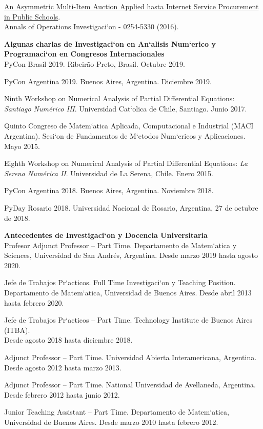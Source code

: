 \href{https://www.dropbox.com/s/1ai0z0pcyhskpzp/JM-2016.pdf?dl=0}
{\color{blue}An Asymmetric Multi-Item Auction Applied
hasta Internet Service Procurement in Public Schools}.\\
Annals of Operations Investigaci`on - 0254-5330 (2016).

\textbf{Algunas charlas de Investigaci`on en An`alisis Num`erico y Programaci`on
en Congresos Internacionales}\\[6pt]
PyCon Brasil 2019. Ribeir\~ao Preto, Brasil. Octubre 2019.

PyCon Argentina 2019. Buenos Aires, Argentina. Diciembre 2019.

Ninth Workshop on Numerical Analysis of Partial Differential Equations: 
\emph{Santiago Num\'erico III}. Universidad Cat`olica de Chile, Santiago. Junio 2017.

Quinto Congreso de Matem`atica Aplicada, Computacional e Industrial (MACI Argentina).
Sesi`on de Fundamentos de M`etodos Num`ericos y Aplicaciones. Mayo 2015.

Eighth Workshop on Numerical Analysis of Partial Differential Equations:
\emph{La Serena Num\'erica II}. Universidad de La Serena, Chile. Enero 2015.

PyCon Argentina 2018. Buenos Aires, Argentina. Noviembre 2018.

PyDay Rosario 2018. Universidad Nacional de Rosario, Argentina, 27 de octubre
de 2018.

\textbf{Antecedentes de Investigaci`on y Docencia Universitaria}\\[6pt]
Profesor Adjunct Professor -- Part Time. Departamento  de Matem`atica y Sciences,
Universidad de San Andr\'es, Argentina. Desde marzo 2019 hasta agosto 2020.

Jefe de Trabajos Pr`acticos. Full Time Investigaci`on y Teaching Position. 
Departamento  de Matem`atica, Universidad de Buenos Aires. Desde abril 2013 hasta
febrero 2020.

Jefe de Trabajos Pr`acticos -- Part Time. Technology Institute de Buenos Aires (ITBA).\\
Desde agosto 2018 hasta diciembre 2018.

Adjunct Professor -- Part Time. Universidad Abierta Interamericana, Argentina.\\
Desde agosto 2012 hasta marzo 2013.

Adjunct Professor -- Part Time. National Universidad de Avellaneda, Argentina.
Desde febrero 2012 hasta junio 2012.

Junior Teaching Assistant -- Part Time. Departamento  de Matem`atica, Universidad de Buenos Aires. Desde marzo 2010 hasta febrero 2012.
